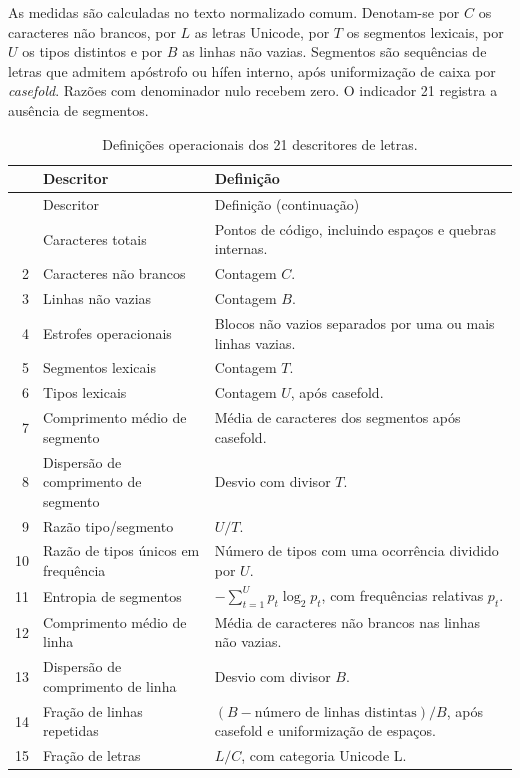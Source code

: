 As medidas são calculadas no texto normalizado comum. Denotam-se por $C$ os caracteres não brancos, por $L$ as letras Unicode, por $T$ os segmentos lexicais, por $U$ os tipos distintos e por $B$ as linhas não vazias. Segmentos são sequências de letras que admitem apóstrofo ou hífen interno, após uniformização de caixa por \textit{casefold}. Razões com denominador nulo recebem zero. O indicador 21 registra a ausência de segmentos.

\begingroup\footnotesize\singlespacing
\begin{longtable}{rP{.31\linewidth}P{.56\linewidth}}
\caption{Definições operacionais dos 21 descritores de letras.}\label{tab:descritores}\\
\toprule & Descritor & Definição \\\midrule\endfirsthead
\toprule & Descritor & Definição (continuação) \\\midrule\endhead
\bottomrule\endfoot
\bottomrule{} & Caracteres totais & Pontos de código, incluindo espaços e quebras internas.\\
2 & Caracteres não brancos & Contagem $C$.\\
3 & Linhas não vazias & Contagem $B$.\\
4 & Estrofes operacionais & Blocos não vazios separados por uma ou mais linhas vazias.\\
5 & Segmentos lexicais & Contagem $T$.\\
6 & Tipos lexicais & Contagem $U$, após casefold.\\
7 & Comprimento médio de segmento & Média de caracteres dos segmentos após casefold.\\
8 & Dispersão de comprimento de segmento & Desvio com divisor $T$.\\
9 & Razão tipo/segmento & $U/T$.\\
10 & Razão de tipos únicos em frequência & Número de tipos com uma ocorrência dividido por $U$.\\
11 & Entropia de segmentos & $-\sum_{t=1}^{U}p_t\log_2p_t$, com frequências relativas $p_t$.\\
12 & Comprimento médio de linha & Média de caracteres não brancos nas linhas não vazias.\\
13 & Dispersão de comprimento de linha & Desvio com divisor $B$.\\
14 & Fração de linhas repetidas & $(B-\text{número de linhas distintas})/B$, após casefold e uniformização de espaços.\\
15 & Fração de letras & $L/C$, com categoria Unicode L.\\

\end{longtable}
